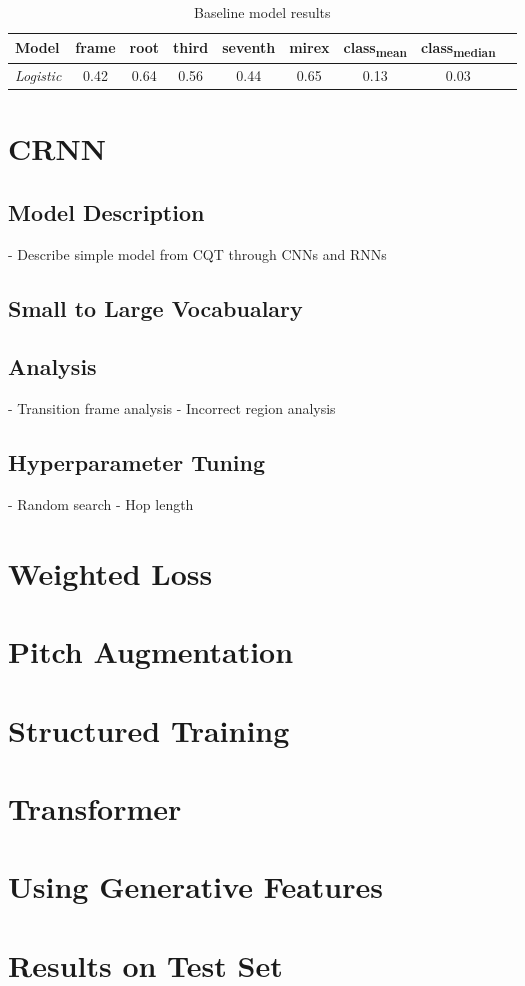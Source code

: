 \begin{table}[h]
    \centering
    \begin{tabular}{lcccccccc}
        \toprule
        Model & frame & root & third & seventh & mirex & class\textsubscript{mean} & class\textsubscript{median} \\  
        \midrule
        \emph{Logistic} & 0.42 & 0.64 & 0.56 & 0.44 & 0.65 & 0.13 & 0.03 \\
        \bottomrule
    \end{tabular}
    \caption{Baseline model results}
    \label{tab:baseline_results}
\end{table}

\section{CRNN}
\subsection{Model Description}
- Describe simple model from CQT through CNNs and RNNs
\subsection{Small to Large Vocabualary}
\subsection{Analysis}
- Transition frame analysis
- Incorrect region analysis
\subsection{Hyperparameter Tuning}
- Random search
- Hop length

\section{Weighted Loss}

\section{Pitch Augmentation}

\section{Structured Training}

\section{Transformer}

\section{Using Generative Features}

\section{Results on Test Set}